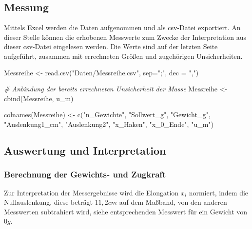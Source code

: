 \documentclass[
  9pt,
]{article}
\newenvironment{Shaded}{\begin{snugshade}}{\end{snugshade}}
\newcommand{\AttributeTok}[1]{\textcolor[rgb]{0.77,0.63,0.00}{#1}}
\newcommand{\CommentTok}[1]{\textcolor[rgb]{0.56,0.35,0.01}{\textit{#1}}}
\newcommand{\FunctionTok}[1]{\textcolor[rgb]{0.00,0.00,0.00}{#1}}
\newcommand{\NormalTok}[1]{#1}
\newcommand{\OtherTok}[1]{\textcolor[rgb]{0.56,0.35,0.01}{#1}}
\newcommand{\StringTok}[1]{\textcolor[rgb]{0.31,0.60,0.02}{#1}}
\begin{document}
\hypertarget{messung}{%
\subsection{Messung}\label{messung}}

Mittels Excel werden die Daten aufgenommen und als csv-Datei exportiert.
An dieser Stelle können die erhobenen Messwerte zum Zwecke der
Interpretation aus dieser csv-Datei eingelesen werden. Die Werte sind
auf der letzten Seite aufgeführt, zusammen mit errechneten Größen und
zugehörigen Unsicherheiten.

\begin{Shaded}
\begin{Highlighting}[]
\NormalTok{Messreihe }\OtherTok{\textless{}{-}} \FunctionTok{read.csv}\NormalTok{(}\StringTok{"Daten/Messreihe.csv"}\NormalTok{, }\AttributeTok{sep=}\StringTok{";"}\NormalTok{, }\AttributeTok{dec =} \StringTok{","}\NormalTok{)}

\CommentTok{\# Anbindung der bereits errechneten Unsicherheit der Masse}
\NormalTok{Messreihe }\OtherTok{\textless{}{-}} \FunctionTok{cbind}\NormalTok{(Messreihe, u\_m)}

\FunctionTok{colnames}\NormalTok{(Messreihe) }\OtherTok{\textless{}{-}} \FunctionTok{c}\NormalTok{(}\StringTok{"n\_Gewichte"}\NormalTok{, }\StringTok{"Sollwert\_g"}\NormalTok{, }\StringTok{"Gewicht\_g"}\NormalTok{, }
                         \StringTok{"Auslenkung1\_cm"}\NormalTok{,  }\StringTok{"Auslenkung2"}\NormalTok{, }\StringTok{"x\_Haken"}\NormalTok{, }
                         \StringTok{"x\_0\_Ende"}\NormalTok{, }\StringTok{"u\_m"}\NormalTok{)}
\end{Highlighting}
\end{Shaded}

\hypertarget{auswertung-und-interpretation}{%
\subsection{Auswertung und
Interpretation}\label{auswertung-und-interpretation}}

\hypertarget{berechnung-der-gewichts--und-zugkraft}{%
\subsubsection{Berechnung der Gewichts- und
Zugkraft}\label{berechnung-der-gewichts--und-zugkraft}}

Zur Interpretation der Messergebnisse wird die Elongation \(x_i\)
normiert, indem die Nullauslenkung, diese beträgt \(11,2 cm\) auf dem
Maßband, von den anderen Messwerten subtrahiert wird, siehe
entsprechenden Messwert für ein Gewicht von \(0g\).
\end{document}
